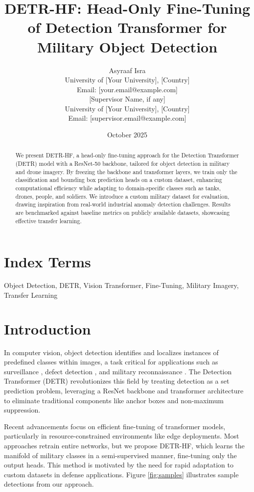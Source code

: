 \documentclass[12pt]{article}
\title{DETR-HF: Head-Only Fine-Tuning of Detection Transformer for Military Object Detection}
\author{Asyraaf Isra \\ University of [Your University], [Country] \\ Email: [your.email@example.com] \\[10pt] [Supervisor Name, if any] \\ University of [Your University], [Country] \\ Email: [supervisor.email@example.com]}
\date{October 2025}
\begin{document}
\maketitle

\begin{abstract}
We present DETR-HF, a head-only fine-tuning approach for the Detection Transformer (DETR) model with a ResNet-50 backbone, tailored for object detection in military and drone imagery. By freezing the backbone and transformer layers, we train only the classification and bounding box prediction heads on a custom dataset, enhancing computational efficiency while adapting to domain-specific classes such as tanks, drones, people, and soldiers. We introduce a custom military dataset for evaluation, drawing inspiration from real-world industrial anomaly detection challenges. Results are benchmarked against baseline metrics on publicly available datasets, showcasing effective transfer learning.
\end{abstract}

\section*{Index Terms}
Object Detection, DETR, Vision Transformer, Fine-Tuning, Military Imagery, Transfer Learning

\section{Introduction}

In computer vision, object detection identifies and localizes instances of predefined classes within images, a task critical for applications such as surveillance \cite{piciarelli2008}, defect detection \cite{mishra2019}, and military reconnaissance \cite{li2022}. The Detection Transformer (DETR) \cite{carion2020} revolutionizes this field by treating detection as a set prediction problem, leveraging a ResNet backbone and transformer architecture to eliminate traditional components like anchor boxes and non-maximum suppression.

Recent advancements focus on efficient fine-tuning of transformer models, particularly in resource-constrained environments like edge deployments. Most approaches retrain entire networks, but we propose DETR-HF, which learns the manifold of military classes in a semi-supervised manner, fine-tuning only the output heads. This method is motivated by the need for rapid adaptation to custom datasets in defense applications. Figure \ref{fig:samples} illustrates sample detections from our approach.
\end{document}
